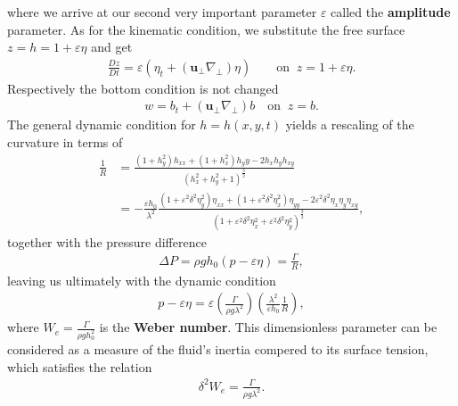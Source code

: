 where we arrive at our second very important parameter $\varepsilon$ called
the \textbf{amplitude} parameter. As for the kinematic condition, we
substitute the free surface $z=h = 1+\varepsilon \eta$ and get
\begin{align}
    \frac{Dz}{Dt} = \varepsilon\left(\eta_t + (\mathbf{u}_\perp
        \nabla_\perp)\eta\right) \qquad \text{on}\;\; z= 1+\varepsilon \eta.
\end{align}
Respectively the bottom condition is not changed
\begin{align}
    w = b_t + (\mathbf{u}_\perp \nabla_\perp) b \quad \text{on}\;\; z= b.
\end{align}
The general dynamic condition for $h = h(x, y, t)$ yields a rescaling of the
curvature in terms of
\begin{align}
   \frac{1}{R}
   &= \frac{(1+h_y^2)h_{x x} + (1+h_x^2)h_yy - 2h_xh_yh_{xy}
   }{\left(h_x^2+h_y^2 +1  \right)^{\frac{3}{2}} } \\
   &= -\frac{\varepsilon h_0}{\lambda^2} \frac{(
   1+\varepsilon^2\delta^2\eta_y^2 )\eta_{x x}+
    (1+\varepsilon^2\delta^2\eta_x^2)\eta_{yy} -
    2\varepsilon^2\delta^2\eta_x\eta_y\eta_{xy}}{\left(
    1+\varepsilon^2\delta^2\eta_x^2+\varepsilon^2\delta^2\eta_y^2
    \right)^{\frac{3}{2}} },
\end{align}
together with the pressure difference
\begin{align}
    \Delta P = \rho g h_0(p - \varepsilon \eta) = \frac{\Gamma}{R},
\end{align}
leaving us ultimately with the dynamic condition
\begin{align}
    p-\varepsilon\eta= \varepsilon\left( \frac{\Gamma}{\rho g\lambda^2}
    \right) \left(\frac{\lambda^2}{\varepsilon h_0}\frac{1}{R}\right),
\end{align}
where $W_e = \frac{\Gamma}{\rho g h_0^2}$ is the \textbf{Weber number}. This
dimensionless parameter can be considered as a measure of the fluid's inertia
compered to its surface tension, which satisfies the relation
\begin{align}
    \delta^2 W_e = \frac{\Gamma}{\rho g \lambda^2}.
\end{align}
